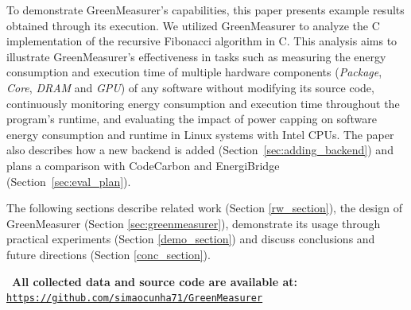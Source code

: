 To demonstrate GreenMeasurer's capabilities, this paper presents example results obtained through its execution. We utilized GreenMeasurer to analyze the C implementation of the recursive Fibonacci algorithm in C. This analysis aims to illustrate GreenMeasurer's effectiveness in tasks such as measuring the energy consumption and execution time of multiple hardware components (\textit{Package}, \textit{Core}, \textit{DRAM} and \textit{GPU}) of any software without modifying its source code, continuously monitoring energy consumption and execution time throughout the program's runtime, and evaluating the impact of power capping on software energy consumption and runtime in Linux systems with Intel CPUs. The paper also describes how a new backend is added (Section~\ref{sec:adding_backend}) and plans a comparison with CodeCarbon and EnergiBridge (Section~\ref{sec:eval_plan}).

The following sections describe related work (Section \ref{rw_section}), the design of GreenMeasurer (Section \ref{sec:greenmeasurer}), demonstrate its usage through practical experiments (Section \ref{demo_section}) and discuss conclusions and future directions (Section \ref{conc_section}).

\begin{tcolorbox}[colback=gray!10!white, colframe=black!60, arc=4pt, boxrule=0.5pt]
\centering
\faGithub\ \textbf{All collected data and source code are available at:}\\[3pt]
\href{https://github.com/simaocunha71/GreenMeasurer}{\texttt{https://github.com/simaocunha71/GreenMeasurer}}
\end{tcolorbox}
